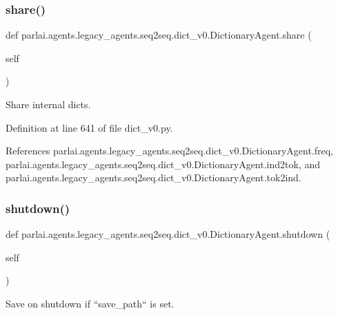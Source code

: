 \subsubsection{\texorpdfstring{share()}{share()}}
{\footnotesize\ttfamily def parlai.\+agents.\+legacy\+\_\+agents.\+seq2seq.\+dict\+\_\+v0.\+Dictionary\+Agent.\+share (\begin{DoxyParamCaption}\item[{}]{self }\end{DoxyParamCaption})}

\begin{DoxyVerb}Share internal dicts.\end{DoxyVerb}
 

Definition at line 641 of file dict\+\_\+v0.\+py.



References parlai.\+agents.\+legacy\+\_\+agents.\+seq2seq.\+dict\+\_\+v0.\+Dictionary\+Agent.\+freq, parlai.\+agents.\+legacy\+\_\+agents.\+seq2seq.\+dict\+\_\+v0.\+Dictionary\+Agent.\+ind2tok, and parlai.\+agents.\+legacy\+\_\+agents.\+seq2seq.\+dict\+\_\+v0.\+Dictionary\+Agent.\+tok2ind.

\mbox{\label{classparlai_1_1agents_1_1legacy__agents_1_1seq2seq_1_1dict__v0_1_1DictionaryAgent_acc5f2818eae15ab8ebe81924600bb6fe}} 
\subsubsection{\texorpdfstring{shutdown()}{shutdown()}}
{\footnotesize\ttfamily def parlai.\+agents.\+legacy\+\_\+agents.\+seq2seq.\+dict\+\_\+v0.\+Dictionary\+Agent.\+shutdown (\begin{DoxyParamCaption}\item[{}]{self }\end{DoxyParamCaption})}

\begin{DoxyVerb}Save on shutdown if ``save_path`` is set.\end{DoxyVerb}
 

